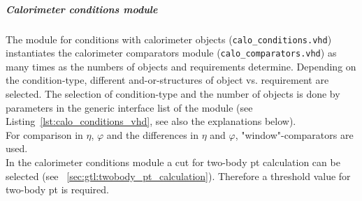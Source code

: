 \subparagraph{Calorimeter conditions module}

The module for conditions with calorimeter objects (\texttt{calo\_conditions.vhd}) instantiates the calorimeter comparators module (\texttt{calo\_comparators.vhd}) as many times as
the numbers of objects and requirements determine. Depending on the condition-type, different and-or-structures of object vs. requirement are selected.
The selection of condition-type and the number of objects is done by parameters in the generic interface list of the module (see Listing~\ref{lst:calo_conditions_vhd},
see also the explanations below).\\
For comparison in $\eta$, $\varphi$ and the differences in $\eta$ and $\varphi$, "window"-comparators are used.\\
In the calorimeter conditions module a cut for two-body pt calculation can be selected (see ~\ref{sec:gtl:twobody_pt_calculation}). Therefore a threshold value for two-body pt is required.\\



